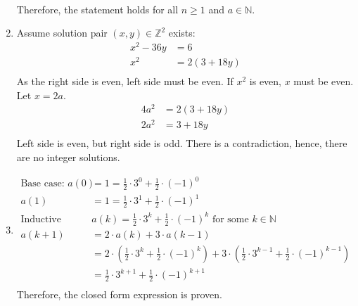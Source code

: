 \documentclass{article}
\begin{document}
\begin{enumerate}[label=\alph*.]
\[\begin{aligned}
              \end{aligned}\]
          Therefore, the statement holds for all $n \geq 1$ and $a \in \mathbb{N}$.
    \item Assume solution pair $(x,y) \in \mathbb{Z}^2$ exists: \[\begin{aligned}
                  x^2-36y & = 6          \\
                  x^2     & = 2(3 + 18y) \\
              \end{aligned}\]
          As the right side is even, left side must be even. If $x^2$ is even, $x$ must be even. Let $x=2a$.
          \[\begin{aligned}
                  4a^2 & = 2(3 + 18y) \\
                  2a^2 & = 3 + 18y    \\
              \end{aligned}\]
          Left side is even, but right side is odd. There is a contradiction, hence, there are no integer solutions.

    \item \[\begin{aligned}
                  \text{Base case: } a(0)        & = 1 = \frac12 \cdot 3^0 + \frac12 \cdot (-1)^0                                                                                          \\
                  a(1)                           & = 1 = \frac12 \cdot 3^1 + \frac12 \cdot (-1)^1                                                                                          \\
                  \text{Inductive step: Assume } & a(k) = \frac12 \cdot 3^k + \frac12 \cdot (-1)^k \text{ for some } k \in \mathbb{N}                                                      \\
                  a(k + 1)                       & = 2 \cdot a(k) + 3 \cdot a(k - 1)                                                                                                       \\
                                                 & = 2 \cdot \left(\frac12 \cdot 3^k + \frac12 \cdot (-1)^k\right) + 3 \cdot \left(\frac12 \cdot 3^{k-1} + \frac12 \cdot (-1)^{k-1}\right) \\
                                                 & = \frac12 \cdot 3^{k+1} + \frac12 \cdot (-1)^{k+1}                                                                                      \\
              \end{aligned}\]
          Therefore, the closed form expression is proven.
\end{enumerate}
\end{document}
